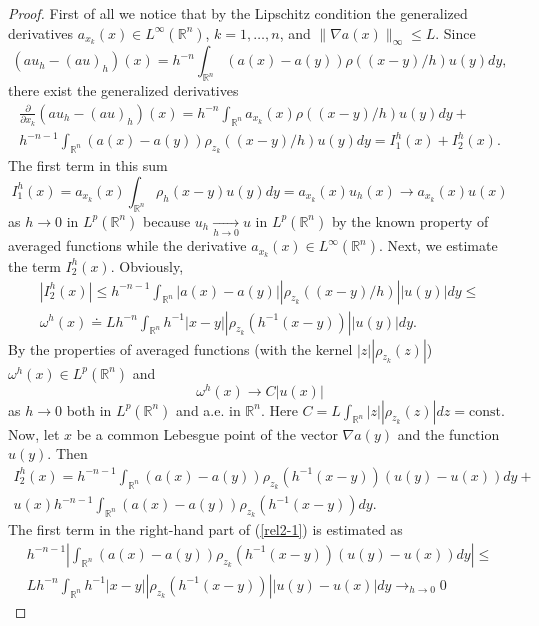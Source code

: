 \documentclass[12pt]{article}
\theoremstyle{plain}
\theoremstyle{definition}
\numberwithin{equation}{section}
\newcommand{\R}{{\mathbb R}}
\newcommand{\const}{\mathrm{const}}
\begin{document}
\begin{proof}
First of all we notice that by the Lipschitz condition the generalized derivatives $a_{x_k}(x)\in L^\infty(\R^n)$, $k=1,\dots,n$, and $\|\nabla a(x)\|_\infty\le L$. Since \[(au_h-(au)_h)(x)=h^{-n}\int_{\R^n}(a(x)-a(y))\rho((x-y)/h) u(y)dy,\]
there exist the generalized derivatives
\begin{align}\label{rel}
\frac{\partial}{\partial x_k}(au_h-(au)_h)(x)=h^{-n}\int_{\R^n}a_{x_k}(x)\rho((x-y)/h) u(y)dy+\nonumber\\ h^{-n-1}\int_{\R^n}(a(x)-a(y))\rho_{z_k}((x-y)/h) u(y)dy=I_1^h(x)+I_2^h(x).
\end{align}
The first term in this sum
\begin{equation}\label{rel1}
I_1^h(x)=a_{x_k}(x)\int_{\R^n}\rho_h(x-y) u(y)dy=a_{x_k}(x)u_h(x)\to a_{x_k}(x)u(x)
\end{equation}
as $h\to 0$ in $L^p(\R^n)$ because $u_h\mathop{\to}\limits_{h\to 0} u$ in $L^p(\R^n)$ by the known property of averaged functions while the derivative $a_{x_k}(x)\in L^\infty(\R^n)$.
Next, we estimate the term $I_2^h(x)$. Obviously,
\begin{align}\label{es1}
|I_2^h(x)|\le h^{-n-1}\int_{\R^n}|a(x)-a(y)||\rho_{z_k}((x-y)/h)| |u(y)|dy\le \nonumber\\ \omega^h(x)\doteq Lh^{-n}\int_{\R^n} h^{-1}|x-y||\rho_{z_k}(h^{-1}(x-y))| |u(y)|dy.
\end{align}
By the properties of averaged functions (with the kernel $|z||\rho_{z_k}(z)|$) $\omega^h(x)\in L^p(\R^n)$ and
\begin{equation}\label{rel2}
\omega^h(x)\to C|u(x)|
\end{equation}
as $h\to 0$ both in $L^p(\R^n)$ and a.e. in $\R^n$. Here $\displaystyle C=L\int_{\R^n} |z||\rho_{z_k}(z)|dz=\const$.
Now, let $x$ be a common Lebesgue point of the vector $\nabla a(y)$ and the function $u(y)$. Then
\begin{align}\label{rel2-1}
I_2^h(x)=h^{-n-1}\int_{\R^n}(a(x)-a(y))\rho_{z_k}(h^{-1}(x-y))(u(y)-u(x))dy+\nonumber\\ u(x)h^{-n-1}\int_{\R^n}(a(x)-a(y))\rho_{z_k}(h^{-1}(x-y))dy.
\end{align}
The first term in the right-hand part of (\ref{rel2-1}) is estimated as
\begin{align}\label{est2-1}
h^{-n-1}\left|\int_{\R^n}(a(x)-a(y))\rho_{z_k}(h^{-1}(x-y))(u(y)-u(x))dy\right|\le \nonumber\\
Lh^{-n}\int_{\R^n}h^{-1}|x-y||\rho_{z_k}(h^{-1}(x-y))||u(y)-u(x)|dy\mathop{\to}_{h\to 0} 0

\end{align}
\end{proof}
\end{document}
